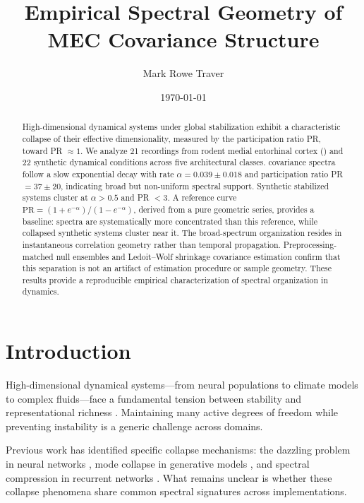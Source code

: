 \documentclass[aps,pre,reprint,twocolumn]{revtex4-2}
\newcommand{\mec}{\text{MEC}}
\begin{document}
\title{Empirical Spectral Geometry of MEC Covariance Structure}

\author{Mark Rowe Traver}

\date{\today}

\begin{abstract}
High-dimensional dynamical systems under global stabilization exhibit a characteristic collapse of their effective dimensionality, measured by the participation ratio PR, toward PR $\approx 1$. We analyze 21 recordings from rodent medial entorhinal cortex (\mec) and 22 synthetic dynamical conditions across five architectural classes. \mec{} covariance spectra follow a slow exponential decay with rate $\alpha = 0.039 \pm 0.018$ and participation ratio PR $= 37 \pm 20$, indicating broad but non-uniform spectral support. Synthetic stabilized systems cluster at $\alpha > 0.5$ and PR $< 3$. A reference curve $\text{PR} = (1+e^{-\alpha})/(1-e^{-\alpha})$, derived from a pure geometric series, provides a baseline: \mec{} spectra are systematically more concentrated than this reference, while collapsed synthetic systems cluster near it. The broad-spectrum organization resides in instantaneous correlation geometry rather than temporal propagation. Preprocessing-matched null ensembles and Ledoit--Wolf shrinkage covariance estimation confirm that this separation is not an artifact of estimation procedure or sample geometry. These results provide a reproducible empirical characterization of spectral organization in \mec{} dynamics.
\end{abstract}

\maketitle

\section{Introduction}

High-dimensional dynamical systems---from neural populations to climate models to complex fluids---face a fundamental tension between stability and representational richness \cite{wainrib2013,ganguli2012}. Maintaining many active degrees of freedom while preventing instability is a generic challenge across domains.

Previous work has identified specific collapse mechanisms: the dazzling problem in neural networks \cite{saxe2014}, mode collapse in generative models \cite{goodfellow2014}, and spectral compression in recurrent networks \cite{pennington2017}. What remains unclear is whether these collapse phenomena share common spectral signatures across implementations.
\end{document}
